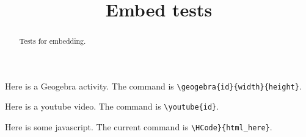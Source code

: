 \documentclass{ximera}
\title{Embed tests}
\begin{document}
	
\begin{abstract}
Tests for embedding.
\end{abstract}

\maketitle

Here is a Geogebra activity. The command is \verb+\geogebra{id}{width}{height}+.


Here is a youtube video. The command is \verb+\youtube{id}+.


Here is some javascript. The current command is \verb+\HCode}{html_here}+.

\end{document}
